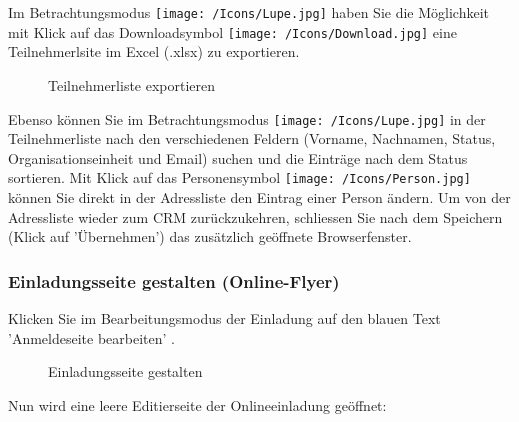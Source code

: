 Im Betrachtungsmodus \texttt{[image: /Icons/Lupe.jpg]} haben Sie die Möglichkeit mit Klick auf das Downloadsymbol \texttt{[image: /Icons/Download.jpg]}  eine Teilnehmerlsite im Excel (.xlsx) zu exportieren.

\begin{figure}[H]
\caption{Teilnehmerliste exportieren}
\end{figure}

Ebenso können Sie im Betrachtungsmodus \texttt{[image: /Icons/Lupe.jpg]} in der Teilnehmerliste nach den verschiedenen Feldern (Vorname, Nachnamen, Status, Organisationseinheit und Email) suchen und die Einträge nach dem Status sortieren. Mit Klick auf das Personensymbol  \texttt{[image: /Icons/Person.jpg]} können Sie direkt in der Adressliste den Eintrag einer Person ändern. Um von der Adressliste wieder zum CRM zurückzukehren, schliessen Sie nach dem Speichern (Klick auf 'Übernehmen') das zusätzlich geöffnete Browserfenster.

\subsubsection{Einladungsseite gestalten (Online-Flyer)}
\label{bkm:Ref112017101}

Klicken Sie im Bearbeitungsmodus der Einladung auf den blauen Text 'Anmeldeseite bearbeiten' . 

\begin{figure}[H]
\caption{Einladungsseite gestalten}
\end{figure}

Nun wird eine leere Editierseite der Onlineeinladung geöffnet:


